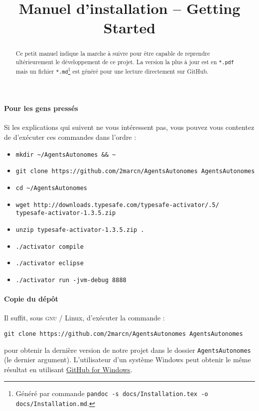 \documentclass[11pt]{article}
\title{Manuel d'installation -- \foreignlanguage{british}{Getting Started}}
\begin{document}
\maketitle
\setcounter{tocdepth}{4}
\tableofcontents

\begin{abstract}
Ce petit manuel indique la marche à suivre pour être capable de reprendre ultérieurement le développement de ce projet. La version la plus à jour est en \texttt{*.pdf} mais un fichier \texttt{*.md}\footnote{Généré par commande \texttt{pandoc -s docs/Installation.tex -o docs/Installation.md}.} est généré pour une lecture directement sur GitHub.
\end{abstract}

\paragraph{Pour les gens pressés}
Si les explications qui suivent ne vous intéressent pas, vous pouvez vous contentez de d'exécuter ces commandes dans l'ordre :
\begin{itemize}
\item \texttt{mkdir \textasciitilde/AgentsAutonomes \&\& \textasciitilde}
\item \texttt{git clone https://github.com/2marcn/AgentsAutonomes AgentsAutonomes}
\item \texttt{cd \textasciitilde/AgentsAutonomes}
\item \texttt{wget http://downloads.typesafe.com/\-typesafe-activator/.5/\-\\typesafe-activator-1.3.5.zip}
\item \texttt{unzip typesafe-activator-1.3.5.zip .}
\item \texttt{./activator compile}
\item \texttt{./activator eclipse}
\item \texttt{./activator run -jvm-debug 8888}
\end{itemize}

\paragraph{Copie du dépôt} Il suffit, sous \textsc{gnu} / Linux, d'exécuter la commande :
\begin{center}\texttt{git clone https://github.com/2marcn/AgentsAutonomes AgentsAutonomes}\end{center}
pour obtenir la dernière version de notre projet dans le dossier \texttt{AgentsAutonomes} (le dernier argument). L'utilisateur d'un système Windows peut obtenir le même résultat en utilisant \href{https://windows.github.com/}{GitHub for Windows}.
\end{document}

